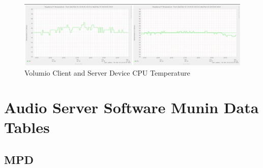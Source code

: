 \documentclass[11pt,a4paper]{scrreprt}
\begin{document}
\begin{figure}[H]
\includegraphics{ResultsAndAnalysis/VolumioServerTestImages/003VolumioCPUTemp.png}
\centering
\caption{Volumio Client and Server Device CPU Temperature}
\label{VolumioCPUTemp}
\end{figure}

\section{\texorpdfstring{Audio Server Software Munin Data Tables
\label{AppendicesAudioServerSoftwareTables}}{Audio Server Software Munin Data Tables }}\label{audio-server-software-munin-data-tables}

\subsection{MPD}\label{mpd-3}
\end{document}
